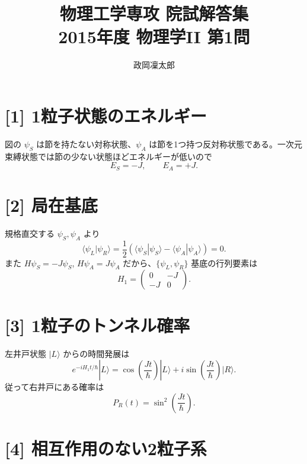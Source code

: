 \documentclass[11pt,a4paper]{article}
\title{物理工学専攻 院試解答集\\2015年度 物理学II 第1問}
\author{政岡凜太郎}
\date{}
\begin{document}
\maketitle

\section*{[1] 1粒子状態のエネルギー}
図の $\psi_S$ は節を持たない対称状態、$\psi_A$ は節を1つ持つ反対称状態である。一次元束縛状態では節の少ない状態ほどエネルギーが低いので
\begin{equation}
 E_S=-J,\qquad E_A=+J.
\end{equation}

\section*{[2] 局在基底}
規格直交する $\psi_S,\psi_A$ より
\begin{equation}
 \langle\psi_L|\psi_R\rangle
 =\frac12(\langle\psi_S|\psi_S\rangle-\langle\psi_A|\psi_A\rangle)=0.
\end{equation}
また $H\psi_S=-J\psi_S$, $H\psi_A=J\psi_A$ だから、$\{\psi_L,\psi_R\}$ 基底の行列要素は
\begin{equation}
 \boxed{H_1=\begin{pmatrix}0&-J\\-J&0\end{pmatrix}.}
\end{equation}

\section*{[3] 1粒子のトンネル確率}
左井戸状態 $|L\rangle$ からの時間発展は
\begin{equation}
 e^{-iH_1t/\hbar}|L\rangle
 =\cos\!\left(\frac{Jt}{\hbar}\right)|L\rangle
 +i\sin\!\left(\frac{Jt}{\hbar}\right)|R\rangle.
\end{equation}
従って右井戸にある確率は
\begin{equation}
 \boxed{P_R(t)=\sin^2\!\left(\frac{Jt}{\hbar}\right).}
\end{equation}

\section*{[4] 相互作用のない2粒子系}
\end{document}
